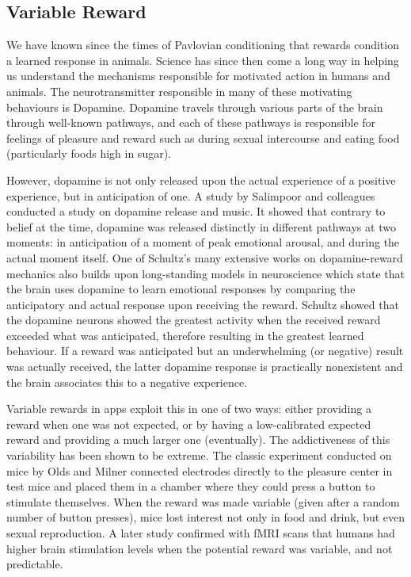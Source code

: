 \subsection{Variable Reward}
We have known since the times of Pavlovian conditioning that rewards condition a learned response in animals. Science has since then come a long way in helping us understand the mechanisms responsible for motivated action in humans and animals. The neurotransmitter responsible in many of these motivating behaviours is Dopamine. Dopamine travels through various parts of the brain through well-known pathways, and each of these pathways is responsible for feelings of pleasure and reward such as during sexual intercourse and eating food (particularly foods high in sugar).

However, dopamine is not only released upon the actual experience of a positive experience, but in anticipation of one. A study by Salimpoor and colleagues \cite{salimpoor2011anatomically} conducted a study on dopamine release and music. It showed that contrary to belief at the time, dopamine was released distinctly in different pathways at two moments: in anticipation of a moment of peak emotional arousal, and during the actual moment itself. One of Schultz's \cite{schultz2016dopamine} many extensive works on dopamine-reward mechanics also builds upon long-standing models in neuroscience which state that the brain uses dopamine to learn emotional responses by comparing the anticipatory and actual response upon receiving the reward. Schultz showed that the dopamine neurons showed the greatest activity when the received reward exceeded what was anticipated, therefore resulting in the greatest learned behaviour. If a reward was anticipated but an underwhelming (or negative) result was actually received, the latter dopamine response is practically nonexistent and the brain associates this to a negative experience.

Variable rewards in apps exploit this in one of two ways: either providing a reward when one was not expected, or by having a low-calibrated expected reward and providing a much larger one (eventually). The addictiveness of this variability has been shown to be extreme. The classic experiment conducted on mice by Olds and Milner \cite{olds1954positive} connected electrodes directly to the pleasure center in test mice and placed them in a chamber where they could press a button to stimulate themselves. When the reward was made variable (given after a random number of button presses), mice lost interest not only in food and drink, but even sexual reproduction. A later study \cite{berns2001predictability} confirmed with fMRI scans that humans had higher brain stimulation levels when the potential reward was variable, and not predictable.

